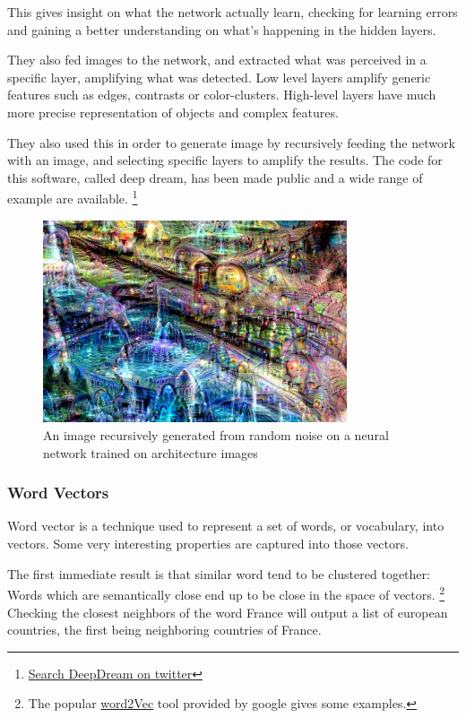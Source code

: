 \documentclass[12pt]{article}
\begin{document}
This gives insight on what the network actually learn, checking for learning errors
and gaining a better understanding on what's happening in the hidden layers.

They also fed images to the network, and extracted what was perceived in a
specific layer, amplifying what was detected. Low level layers amplify generic
features such as edges, contrasts or color-clusters. High-level layers have much
more precise representation of objects and complex features.

They also used this in order to generate image by recursively feeding the network with
an image, and selecting specific layers to amplify the results. The code for this
software, called deep dream, has been made public and a wide range of example are
available.
\footnote{\href{https://twitter.com/search?q=\%23deepdream&src=tyah\&lang=en}{Search DeepDream on twitter}}

\begin{figure}[ht]
    \centering
    \includegraphics[width=0.8\textwidth]{deepdream}
    \caption{An image recursively generated from random noise on a neural network trained on architecture images}
    \label{fig:deepdream}
\end{figure}

\subsubsection{Word Vectors}

Word vector is a technique used to represent a set of words, or vocabulary, into
vectors. Some very interesting properties are captured into those vectors.

The first immediate result is that similar word tend to be clustered together:
Words which are semantically close end up to be close in the space of vectors.
\footnote{The popular \href{https://code.google.com/p/word2vec/}{word2Vec} tool provided by google gives some examples.}
Checking the closest neighbors of the word France will output a list of european
countries, the first being neighboring countries of France.
\end{document}
